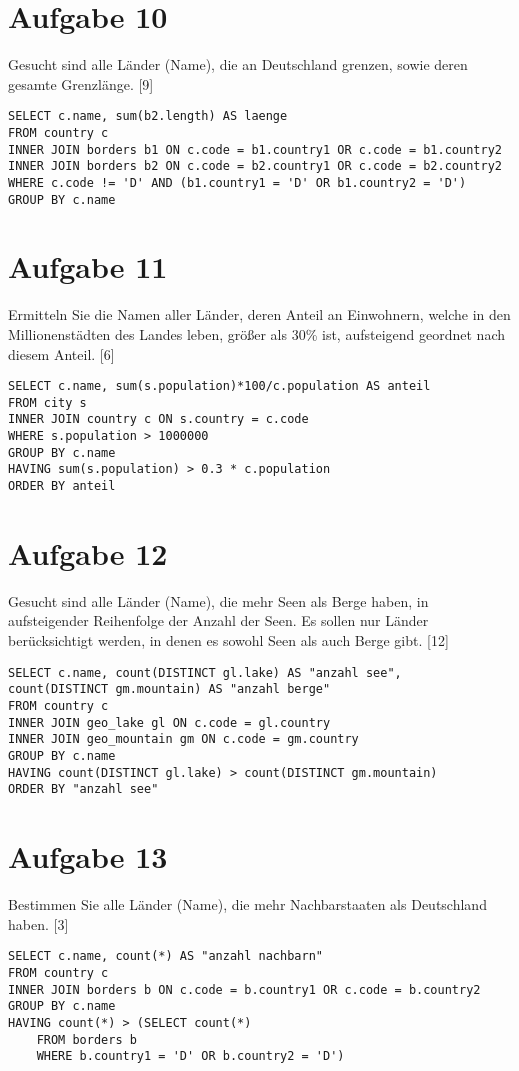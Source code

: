 \documentclass{article}
\begin{document}
	\section*{Aufgabe 10}
	Gesucht sind alle Länder (Name), die an Deutschland grenzen, sowie deren gesamte Grenzlänge. [9]
	\begin{lstlisting}[style=sql,tabsize=2]
SELECT c.name, sum(b2.length) AS laenge
FROM country c 
INNER JOIN borders b1 ON c.code = b1.country1 OR c.code = b1.country2 
INNER JOIN borders b2 ON c.code = b2.country1 OR c.code = b2.country2
WHERE c.code != 'D' AND (b1.country1 = 'D' OR b1.country2 = 'D')
GROUP BY c.name	
	\end{lstlisting}
	
	\section*{Aufgabe 11}
	Ermitteln Sie die Namen aller Länder, deren Anteil an Einwohnern, welche in den Millionenstädten des Landes leben, größer als 30\% ist, aufsteigend geordnet nach diesem Anteil. [6]
	\begin{lstlisting}[style=sql,tabsize=2]
SELECT c.name, sum(s.population)*100/c.population AS anteil 
FROM city s 
INNER JOIN country c ON s.country = c.code 
WHERE s.population > 1000000 
GROUP BY c.name
HAVING sum(s.population) > 0.3 * c.population
ORDER BY anteil
	\end{lstlisting}
	
	\section*{Aufgabe 12}
	Gesucht sind alle Länder (Name), die mehr Seen als Berge haben, in aufsteigender Reihenfolge der Anzahl der Seen. Es sollen nur Länder berücksichtigt werden, in denen es sowohl Seen als auch Berge gibt. [12]
	\begin{lstlisting}[style=sql,tabsize=2]
SELECT c.name, count(DISTINCT gl.lake) AS "anzahl see", 
count(DISTINCT gm.mountain) AS "anzahl berge"
FROM country c 
INNER JOIN geo_lake gl ON c.code = gl.country 
INNER JOIN geo_mountain gm ON c.code = gm.country
GROUP BY c.name
HAVING count(DISTINCT gl.lake) > count(DISTINCT gm.mountain) 
ORDER BY "anzahl see"
	\end{lstlisting}
	
	\section*{Aufgabe 13}
	Bestimmen Sie alle Länder (Name), die mehr Nachbarstaaten als Deutschland haben. [3]
	\begin{lstlisting}[style=sql,tabsize=2]
SELECT c.name, count(*) AS "anzahl nachbarn"
FROM country c 
INNER JOIN borders b ON c.code = b.country1 OR c.code = b.country2 
GROUP BY c.name
HAVING count(*) > (SELECT count(*)
	FROM borders b
	WHERE b.country1 = 'D' OR b.country2 = 'D')
	\end{lstlisting}
	
\end{document}
